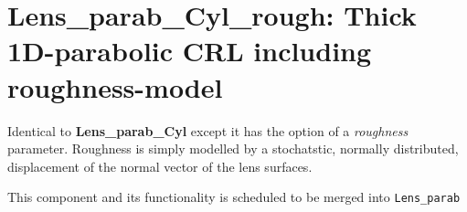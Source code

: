\section{Lens\_parab\_Cyl\_rough: Thick 1D-parabolic CRL including roughness-model}
\label{s:lens-parab-cyl-rough}

Identical to \textbf{Lens\_parab\_Cyl} except it has the option of a \textit{roughness} parameter.
Roughness is simply modelled by a stochatstic, normally distributed, displacement of the normal vector of the lens surfaces.

This component and its functionality is scheduled to be merged into \texttt{Lens\_parab}

